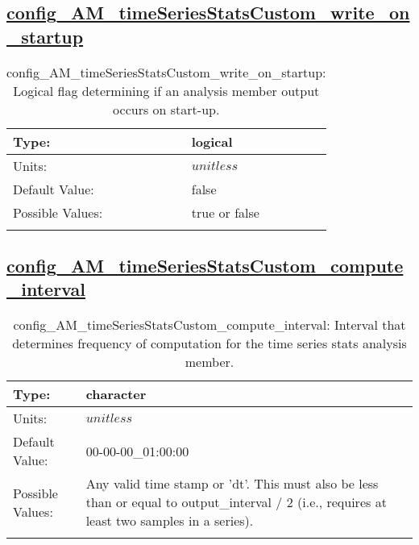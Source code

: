 \subsection[config\_AM\_timeSeriesStatsCustom\_write\_on\_startup]{\hyperref[sec:nm_tab_AM_timeSeriesStatsCustom]{config\_AM\_timeSeriesStatsCustom\_write\_on\_startup}}
\label{subsec:nm_sec_config_AM_timeSeriesStatsCustom_write_on_startup}
\begin{center}
\begin{longtable}{| p{2.0in} || p{4.0in} |}
    \hline
    Type: & logical \\
    \hline
    Units: & $unitless$ \\
    \hline
    Default Value: & false \\
    \hline
    Possible Values: & true or false \\
    \hline
    \caption{config\_AM\_timeSeriesStatsCustom\_write\_on\_startup: Logical flag determining if an analysis member output occurs on start-up.}
\end{longtable}
\end{center}
\subsection[config\_AM\_timeSeriesStatsCustom\_compute\_interval]{\hyperref[sec:nm_tab_AM_timeSeriesStatsCustom]{config\_AM\_timeSeriesStatsCustom\_compute\_interval}}
\label{subsec:nm_sec_config_AM_timeSeriesStatsCustom_compute_interval}
\begin{center}
\begin{longtable}{| p{2.0in} || p{4.0in} |}
    \hline
    Type: & character \\
    \hline
    Units: & $unitless$ \\
    \hline
    Default Value: & 00-00-00\_01:00:00 \\
    \hline
    Possible Values: & Any valid time stamp or 'dt'. This must also be less than or equal to output\_interval / 2 (i.e., requires at least two samples in a series). \\
    \hline
    \caption{config\_AM\_timeSeriesStatsCustom\_compute\_interval: Interval that determines frequency of computation for the time series stats analysis member.}
\end{longtable}
\end{center}
